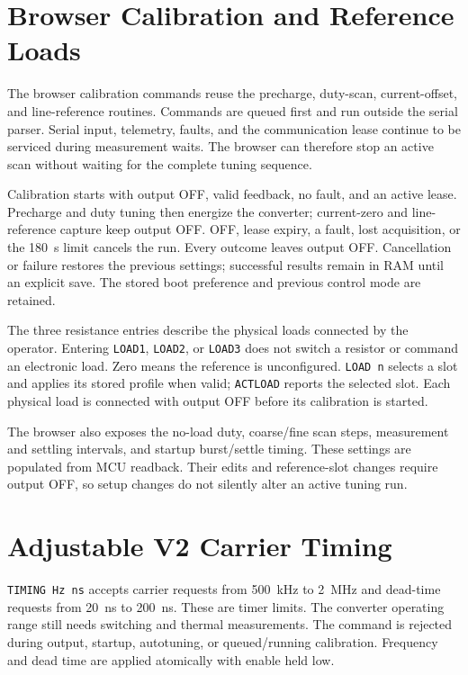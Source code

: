 \section{Browser Calibration and Reference Loads}
\label{sec:app-fw-web-calibration}

The browser calibration commands reuse the precharge, duty-scan, current-offset, and line-reference routines. Commands are queued first and run outside the serial parser. Serial input, telemetry, faults, and the communication lease continue to be serviced during measurement waits. The browser can therefore stop an active scan without waiting for the complete tuning sequence.

Calibration starts with output OFF, valid feedback, no fault, and an active lease. Precharge and duty tuning then energize the converter; current-zero and line-reference capture keep output OFF. OFF, lease expiry, a fault, lost acquisition, or the \SI{180}{\second} limit cancels the run. Every outcome leaves output OFF. Cancellation or failure restores the previous settings; successful results remain in RAM until an explicit save. The stored boot preference and previous control mode are retained.

The three resistance entries describe the physical loads connected by the operator. Entering \texttt{LOAD1}, \texttt{LOAD2}, or \texttt{LOAD3} does not switch a resistor or command an electronic load. Zero means the reference is unconfigured. \texttt{LOAD n} selects a slot and applies its stored profile when valid; \texttt{ACTLOAD} reports the selected slot. Each physical load is connected with output OFF before its calibration is started.

The browser also exposes the no-load duty, coarse/fine scan steps, measurement and settling intervals, and startup burst/settle timing. These settings are populated from MCU readback. Their edits and reference-slot changes require output OFF, so setup changes do not silently alter an active tuning run.

\section{Adjustable V2 Carrier Timing}
\label{sec:app-fw-carrier-timing}

\texttt{TIMING Hz ns} accepts carrier requests from \SI{500}{\kilo\hertz} to \SI{2}{\mega\hertz} and dead-time requests from \SI{20}{\nano\second} to \SI{200}{\nano\second}. These are timer limits. The converter operating range still needs switching and thermal measurements. The command is rejected during output, startup, autotuning, or queued/running calibration. Frequency and dead time are applied atomically with enable held low.

